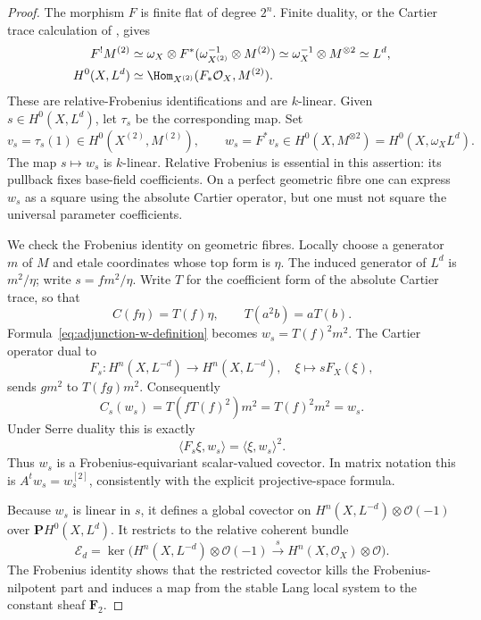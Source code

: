 \begin{proof}
The morphism $F$ is finite flat of degree $2^n$.  Finite duality,
or the Cartier trace calculation of
\cite[Lemma~1.3.6, Proposition~1.3.7, Theorem~1.3.8, pp.~26--28]
{BrionKumar2005}, gives
\begin{align}
 F^!M^{(2)}
 &\simeq \omega_X\otimes F^*(\omega_{X^{(2)}}^{-1}\otimes M^{(2)})
       \simeq\omega_X^{-1}\otimes M^{\otimes2}
       \simeq L^d,\label{eq:adjunction-finite-duality}\\
 H^0(X,L^d)
 &\simeq\Hom_{X^{(2)}}(F_*\mathcal O_X,M^{(2)}).
 \label{eq:adjunction-section-map}
\end{align}
These are relative-Frobenius identifications and are $k$-linear.
Given $s\in H^0(X,L^d)$, let $\tau_s$ be the corresponding map.
Set
\begin{equation}\label{eq:adjunction-w-definition}
 v_s=\tau_s(1)\in H^0(X^{(2)},M^{(2)}),\qquad
 w_s=F^*v_s\in H^0(X,M^{\otimes2})
                  =H^0(X,\omega_X L^d).
\end{equation}
The map $s\mapsto w_s$ is $k$-linear.  Relative Frobenius is
essential in this assertion: its pullback fixes base-field
coefficients.  On a perfect geometric fibre one can express
$w_s$ as a square using the absolute Cartier operator, but
one must not square the universal parameter coefficients.

We check the Frobenius identity on geometric fibres.  Locally
choose a generator $m$ of $M$ and etale coordinates whose top
form is $\eta$.  The induced generator of $L^d$ is $m^2/\eta$;
write $s=fm^2/\eta$.  Write $T$ for the coefficient form of
the absolute Cartier trace, so that
\[
 C(f\eta)=T(f)\eta,\qquad T(a^2b)=aT(b).
\]
Formula~\eqref{eq:adjunction-w-definition} becomes
$w_s=T(f)^2m^2$.  The Cartier operator dual to
\[
 F_s:H^n(X,L^{-d})\longrightarrow H^n(X,L^{-d}),
       \quad \xi\longmapsto sF_X(\xi),
\]
sends $gm^2$ to $T(fg)m^2$.  Consequently
\begin{equation}\label{eq:adjunction-covector-Cartier}
 C_s(w_s)=T(fT(f)^2)m^2=T(f)^2m^2=w_s.
\end{equation}
Under Serre duality this is exactly
\[
 \langle F_s\xi,w_s\rangle=\langle\xi,w_s\rangle^2.
\]
Thus $w_s$ is a Frobenius-equivariant scalar-valued covector.
In matrix notation this is $A^tw_s=w_s^{[2]}$, consistently
with the explicit projective-space formula.

Because $w_s$ is linear in $s$, it defines a global covector
on $H^n(X,L^{-d})\otimes\mathcal O(-1)$ over
$\mathbf P H^0(X,L^d)$.  It restricts to the relative coherent
bundle
\[
 \mathcal E_d=\ker\bigl(H^n(X,L^{-d})\otimes\mathcal O(-1)
       \xrightarrow{\ s\ }H^n(X,\mathcal O_X)\otimes\mathcal O\bigr).
\]
The Frobenius identity shows that the restricted covector
kills the Frobenius-nilpotent part and induces a map from
the stable Lang local system to the constant sheaf
$\mathbf F_2$.


\end{proof}
